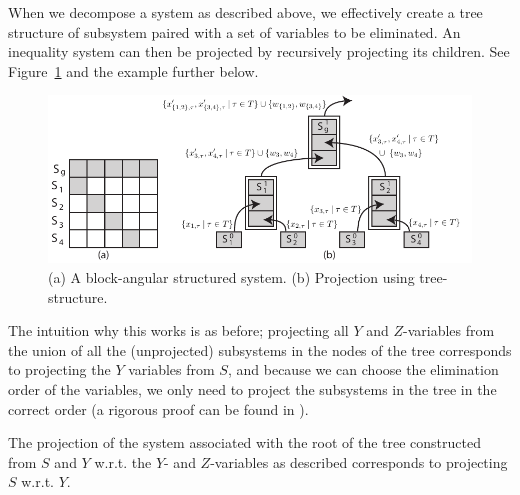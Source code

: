 \documentclass{llncs}
\begin{document}
When we decompose a system as described above, we effectively create a tree structure of subsystem paired with a set of variables to be eliminated. An inequality system can then be projected by recursively projecting its children. See Figure~\ref{fig:decomp2} and the example further below.
\begin{figure}[t!]
	\centering
		\includegraphics[scale=0.9]{figures/Example5.pdf}
	\caption{(a) A block-angular structured system. (b) Projection using tree-structure.}
	\label{fig:decomp2}
\end{figure}
The intuition why this works is as before; projecting all $Y$ and $Z$-variables from the union of all the (unprojected) subsystems in the nodes of the tree corresponds to projecting the $Y$ variables from $S$, and because we can choose the elimination order of the variables, we only need to project the subsystems in the tree in the correct order (a rigorous proof can be found in \cite{mytechrep}).

\begin{proposition}
The projection of the system associated with the root of the tree constructed from $S$ and $Y$ w.r.t. the $Y$- and $Z$-variables as described corresponds to projecting $S$ w.r.t. $Y$.
\end{proposition}
\end{document}
